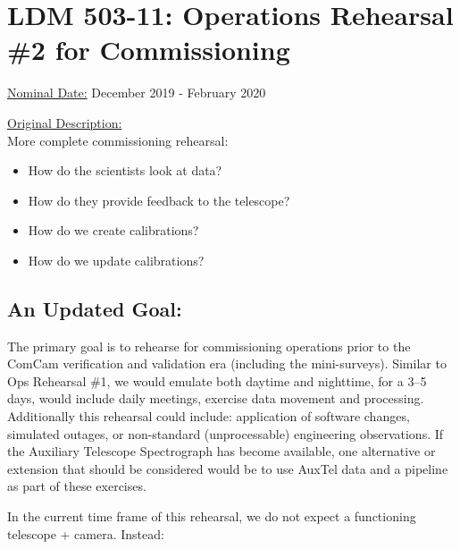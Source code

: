 
\section{LDM 503-11: Operations Rehearsal \#2 for Commissioning}

\underline{Nominal Date:} December 2019 - February 2020

\underline{Original Description:}\\
More complete commissioning rehearsal: 
\begin{itemize}[topsep=-8pt]
\item How do the scientists look at data? 
\item How do they provide feedback to the telescope?
\item How do we create calibrations?
\item How do we update calibrations?
\end{itemize}

\subsection{An Updated Goal:}

The primary goal is to rehearse for commissioning operations prior to the ComCam 
verification and validation era (including the mini-surveys).  
Similar to Ops Rehearsal \#1, we would emulate both daytime and nighttime, 
for a 3--5 days, would include daily meetings, exercise data movement and
processing.  Additionally this rehearsal could include: application of software 
changes, simulated outages, or non-standard (unprocessable) engineering 
observations.  If the Auxiliary Telescope Spectrograph has become available,
one alternative or extension that should be considered would be to use AuxTel 
data and a pipeline as part of these exercises.

In the current time frame of this rehearsal, we do not expect a functioning 
telescope + camera.  Instead:


